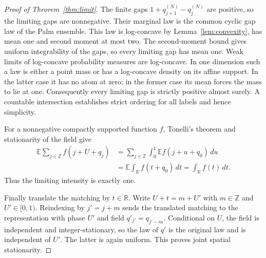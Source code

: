 \documentclass[10pt,a4paper]{amsart}
\newcommand{\E}{\mathbb E}
\newcommand{\R}{\mathbb R}
\newcommand{\Z}{\mathbb Z}
\theoremstyle{plain}
\theoremstyle{remark}
\begin{document}
\begin{proof}[Proof of Theorem~\ref{thm:limit}]
The finite gaps $1+q_{j+1}^{(N)}-q_j^{(N)}$ are positive, so the
limiting gaps are nonnegative. Their marginal law is the common
cyclic gap law of the Palm ensemble. This law is log-concave by
Lemma~\ref{lem:convexity}, has mean one and second moment at most
two. The second-moment bound gives uniform integrability of the
gaps, so every limiting gap has mean one. Weak limits of log-concave
probability measures are log-concave. In one dimension such a law
is either a point mass or has a log-concave density on its affine
support. In the latter case it has no atom at zero; in the former
case its mean forces the mass to lie at one. Consequently every
limiting gap is strictly positive almost surely. A countable
intersection establishes strict ordering for all labels and hence
simplicity.

For a nonnegative compactly supported function $f$, Tonelli's theorem
and stationarity of the field give
\begin{align*}
 \E\sum_{j\in\Z}f(j+U+q_j)
 &=\sum_{j\in\Z}\int_0^1\E f(j+u+q_0)\,du\\
 &=\E\int_\R f(t+q_0)\,dt
 =\int_\R f(t)\,dt.
\end{align*}
Thus the limiting intensity is exactly one.

Finally translate the matching by $t\in\R$. Write
$U+t=m+U'$ with $m\in\Z$ and $U'\in[0,1)$. Reindexing by
$j'=j+m$ sends the translated matching to the representation with
phase $U'$ and field $q'_{j'}=q_{j'-m}$. Conditional on $U$, the
field is independent and integer-stationary, so the law of $q'$ is
the original law and is independent of $U'$. The latter is again
uniform. This proves joint spatial stationarity.
\end{proof}
\end{document}
